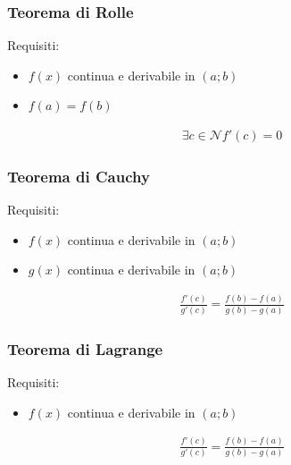 \documentclass[a4paper]{article}
\begin{document}
	\subsubsection*{Teorema di Rolle}
	Requisiti:
	\begin{itemize}
		\item $f(x)$ continua e derivabile in $(a;b)$
		\item $f(a) = f(b)$
	\end{itemize}
	\begin{align*}
		\exists c \in \mathcal{N} f'(c) = 0
	\end{align*}
	\subsubsection*{Teorema di Cauchy}
	Requisiti:
	\begin{itemize}
		\item $f(x)$ continua e derivabile in $(a;b)$
		\item $g(x)$ continua e derivabile in $(a;b)$
	\end{itemize}
	\begin{align*}
	\frac{f'(c)}{g'(c)} = \frac{f(b)-f(a)}{g(b)-g(a)}
	\end{align*}
	
	\subsubsection*{Teorema di Lagrange}
	Requisiti:
	\begin{itemize}
		\item $f(x)$ continua e derivabile in $(a;b)$
	\end{itemize}
	\begin{align*}
	\frac{f'(c)}{g'(c)} = \frac{f(b)-f(a)}{g(b)-g(a)}
	\end{align*}
	
	\newpage
\end{document}
